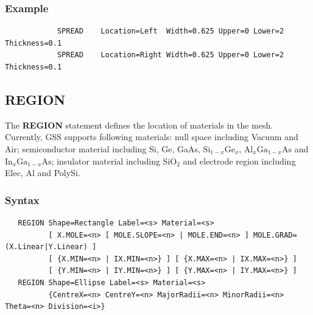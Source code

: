 \documentclass[11pt,pdftex]{article}
\begin{document}
\subsubsection*{Example}
\begin{verbatim}
            SPREAD    Location=Left  Width=0.625 Upper=0 Lower=2 Thickness=0.1
            SPREAD    Location=Right Width=0.625 Upper=0 Lower=2 Thickness=0.1
\end{verbatim}


\newpage
\subsection{REGION}
The \textbf{REGION} statement defines the location of materials in
the mesh. Currently, GSS supports following materials: null space
including Vacuum and Air; semiconductor material including Si, Ge,
GaAs, $\mathrm{Si}_{1-x}\mathrm{Ge}_x$,
$\mathrm{Al}_x\mathrm{Ga}_{1-x}\mathrm{As}$ and
$\mathrm{In}_x\mathrm{Ga}_{1-x}\mathrm{As}$; insulator material
including $\mathrm{SiO}_2$ and electrode region including Elec, Al
and PolySi.

\subsubsection*{Syntax}
\begin{verbatim}
   REGION Shape=Rectangle Label=<s> Material=<s>
          [ X.MOLE=<n> [ MOLE.SLOPE=<n> | MOLE.END=<n> ] MOLE.GRAD=(X.Linear|Y.Linear) ]
          [ {X.MIN=<n> | IX.MIN=<n>} ] [ {X.MAX=<n> | IX.MAX=<n>} ]
          [ {Y.MIN=<n> | IY.MIN=<n>} ] [ {Y.MAX=<n> | IY.MAX=<n>} ]
   REGION Shape=Ellipse Label=<s> Material=<s>
          {CentreX=<n> CentreY=<n> MajorRadii=<n> MinorRadii=<n> Theta=<n> Division=<i>}
\end{verbatim}
\end{document}
